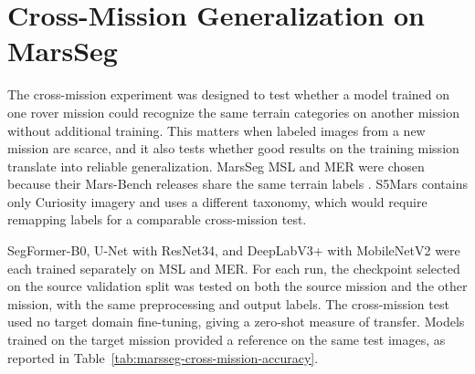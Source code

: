 
\section{Cross-Mission Generalization on MarsSeg}
\label{sec:marsseg-cross-mission-generalization}

The cross-mission experiment was designed to test whether a model trained on one rover mission could recognize the same terrain categories on another mission without additional training. This matters when labeled images from a new mission are scarce, and it also tests whether good results on the training mission translate into reliable generalization. MarsSeg MSL and MER were chosen because their Mars-Bench releases share the same terrain labels \cite{purohit2025marsbench}. S5Mars contains only Curiosity imagery and uses a different taxonomy, which would require remapping labels for a comparable cross-mission test.

SegFormer-B0, U-Net with ResNet34, and DeepLabV3+ with MobileNetV2 were each trained separately on MSL and MER. For each run, the checkpoint selected on the source validation split was tested on both the source mission and the other mission, with the same preprocessing and output labels. The cross-mission test used no target domain fine-tuning, giving a zero-shot measure of transfer. Models trained on the target mission provided a reference on the same test images, as reported in Table~\ref{tab:marsseg-cross-mission-accuracy}.

